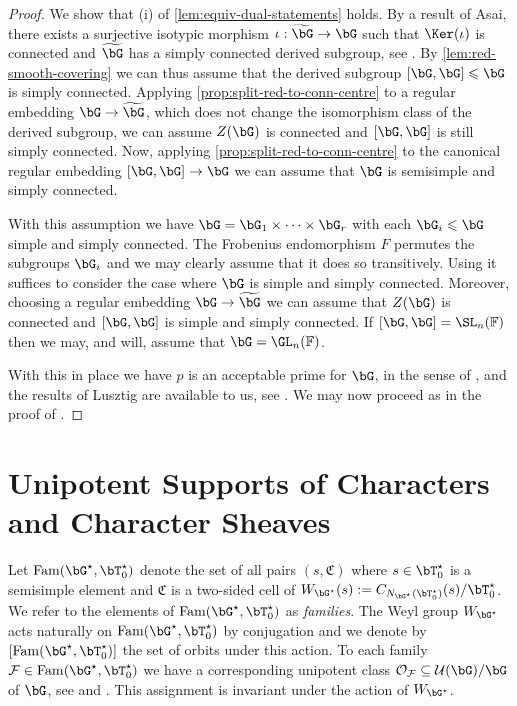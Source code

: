 \documentclass[eqthmnum,nocolour,skinny]{jt-calcs}
\DeclareMathOperator{\Fam}{Fam}
\begin{document}
\begin{proof}
We show that (i) of \cref{lem:equiv-dual-statements} holds. By a result of Asai, there exists a surjective isotypic morphism $\iota : \widetilde{\bG} \to \bG$ such that $\Ker(\iota)$ is connected and $\widetilde{\bG}$ has a simply connected derived subgroup, see \cite[1.21]{taylor:2017:arxiv-structure-of-root-data}. By \cref{lem:red-smooth-covering} we can thus assume that the derived subgroup $[\bG,\bG] \leqslant \bG$ is simply connected. Applying \cref{prop:split-red-to-conn-centre} to a regular embedding $\bG \to \widetilde{\bG}$, which does not change the isomorphism class of the derived subgroup, we can assume $Z(\bG)$ is connected and $[\bG,\bG]$ is still simply connected. 
Now, applying \cref{prop:split-red-to-conn-centre} to the canonical regular embedding $[\bG,\bG] \to \bG$ we can assume that $\bG$ is semisimple and simply connected.

With this assumption we have $\bG = \bG_1 \times \cdots \times \bG_r$ with each $\bG_i \leqslant \bG$ simple and simply connected. The Frobenius endomorphism $F$ permutes the subgroups $\bG_i$ and we may clearly assume that it does so transitively. Using \cite[8.3]{taylor:2017:arxiv-structure-of-root-data} it suffices to consider the case where $\bG$ is simple and simply connected. Moreover, choosing a regular embedding $\bG \to \widetilde{\bG}$ we can assume that $Z(\bG)$ is connected and $[\bG,\bG]$ is simple and simply connected. If $[\bG,\bG] = \SL_n(\mathbb{F})$ then we may, and will, assume that $\bG = \GL_n(\mathbb{F})$.

With this in place we have $p$ is an acceptable prime for $\bG$, in the sense of \cite[6.1]{taylor:2016:GGGRs-small-characteristics}, and the results of Lusztig \cite{lusztig:1992:a-unipotent-support} are available to us, see \cite[13.6]{taylor:2016:GGGRs-small-characteristics}. We may now proceed as in the proof of \cite[2.6]{bezrukavnikov-liebeck-shalev-tiep:2017:character-bounds-grps-Lie-type}.
\end{proof}

\section{Unipotent Supports of Characters and Character Sheaves}\label{sec:unip-supp}
\begin{pa}
Let $\Fam(\bG^{\star},\bT_0^{\star})$ denote the set of all pairs $(s,\mathfrak{C})$ where $s \in \bT_0^{\star}$ is a semisimple element and $\mathfrak{C}$ is a two-sided cell of $W_{\bG^{\star}}(s) := C_{N_{\bG^{\star}}(\bT_0^{\star})}(s)/\bT_0^{\star}$. We refer to the elements of $\Fam(\bG^{\star},\bT_0^{\star})$ as \emph{families}. The Weyl group $W_{\bG^{\star}}$ acts naturally on $\Fam(\bG^{\star},\bT_0^{\star})$ by conjugation and we denote by $[\Fam(\bG^{\star},\bT_0^{\star})]$ the set of orbits under this action. To each family $\mathcal{F} \in \Fam(\bG^{\star},\bT_0^{\star})$ we have a corresponding unipotent class $\mathcal{O_F} \subseteq \mathcal{U}(\bG)/\bG$ of $\bG$, see \cite[10.5]{lusztig:1992:a-unipotent-support} and \cite[12.9]{taylor:2016:GGGRs-small-characteristics}. This assignment is invariant under the action of $W_{\bG^{\star}}$.
\end{pa}
\end{document}
